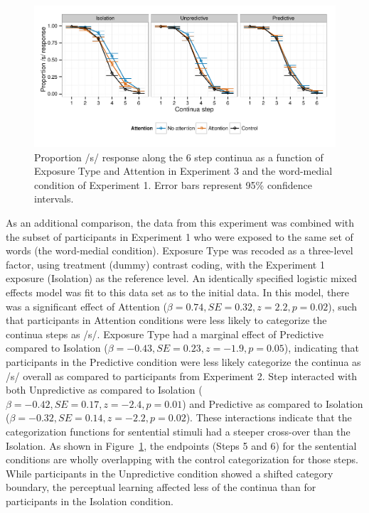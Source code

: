 \begin{figure}[!ht]
\caption{Proportion /s/ response along the 6 step continua as a function of Exposure Type and Attention in Experiment 3 and the word-medial condition of Experiment 1.  Error bars represent 95\% confidence intervals.}
\label{fig:exp23categ}
\begin{center}
\includegraphics[width=\textwidth]{graphs/exp23_categresults}
\end{center}
\end{figure}


As an additional comparison, the data from this experiment was combined with the subset of participants in Experiment 1 who were exposed to the same set of words (the word-medial condition).  
Exposure Type was recoded as a three-level factor, using treatment (dummy) contrast coding, with the Experiment 1 exposure (Isolation) as the reference level. 
An identically specified logistic mixed effects model was fit to this data set as to the initial data.  
In this model, there was a significant effect of Attention ($\beta = 0.74, SE = 0.32, z = 2.2, p = 0.02$), such that participants in Attention conditions were less likely to categorize the continua steps as /s/.  
Exposure Type had a marginal effect of Predictive compared to Isolation ($\beta = -0.43, SE = 0.23, z = -1.9, p = 0.05$), indicating that participants in the Predictive condition were less likely categorize the continua as /s/ overall as compared to participants from Experiment 2. 
Step interacted with both Unpredictive as compared to Isolation ($\beta = -0.42, SE = 0.17, z = -2.4, p = 0.01$) and Predictive as compared to Isolation ($\beta = -0.32, SE = 0.14, z = -2.2, p = 0.02$).
These interactions indicate that the categorization functions for sentential stimuli had a steeper cross-over than the Isolation. 
As shown in Figure~\ref{fig:exp23categ}, the endpoints (Steps 5 and 6) for the sentential conditions are wholly overlapping with the control categorization for those steps.
While participants in the Unpredictive condition showed a shifted category boundary, the perceptual learning affected less of the continua than for participants in the Isolation condition.

